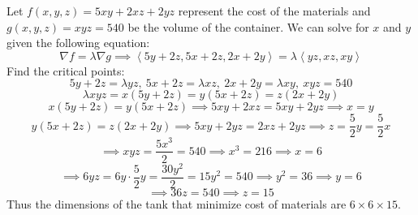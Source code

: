 \documentclass[12pt]{article}
\newcommand{\angleb}[1]{\left\langle#1\right\rangle}
\begin{document}
\pagestyle{fancy}
\fancyhead{}

\normalsize
\noindent
Let $f(x,y,z)=5xy+2xz+2yz$ represent the cost of the materials and $g(x,y,z)=xyz=540$ be the volume of the container. We can solve for $x$ and $y$ given the following equation:
\[\nabla f=\lambda\nabla g\implies\angleb{5y+2z,5x+2z,2x+2y}=\lambda\angleb{yz,xz,xy}\]
Find the critical points:
\[5y+2z=\lambda yz,\ 5x+2z=\lambda xz,\ 2x+2y=\lambda xy,\ xyz=540\]
\[\lambda xyz=x(5y+2z)=y(5x+2z)=z(2x+2y)\]
\[x(5y+2z)=y(5x+2z)\implies5xy+2xz=5xy+2yz\implies x=y\]
\[y(5x+2z)=z(2x+2y)\implies5xy+2yz=2xz+2yz\implies z=\frac{5}{2}y=\frac{5}{2}x\]
\[\implies xyz=\frac{5x^3}{2}=540\implies x^3=216\implies x=6\]
\[\implies 6yz=6y\cdot\frac{5}{2}y=\frac{30y^2}{2}=15y^2=540\implies y^2=36\implies y=6\]
\[\implies 36z=540\implies z=15\]
Thus the dimensions of the tank that minimize cost of materials are $6\times6\times15$.
\end{document}
